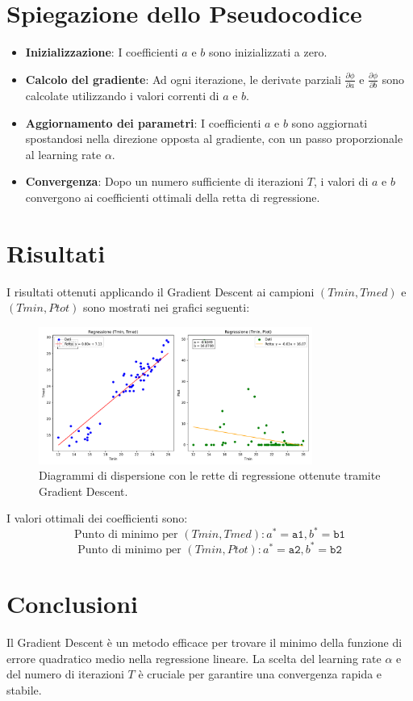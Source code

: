 \documentclass{article}
\begin{document}
\section{Spiegazione dello Pseudocodice}
\begin{itemize}
    \item \textbf{Inizializzazione}: I coefficienti \(a\) e \(b\) sono inizializzati a zero.
    \item \textbf{Calcolo del gradiente}: Ad ogni iterazione, le derivate parziali \(\frac{\partial \phi}{\partial a}\) e \(\frac{\partial \phi}{\partial b}\) sono calcolate utilizzando i valori correnti di \(a\) e \(b\).
    \item \textbf{Aggiornamento dei parametri}: I coefficienti \(a\) e \(b\) sono aggiornati spostandosi nella direzione opposta al gradiente, con un passo proporzionale al learning rate \(\alpha\).
    \item \textbf{Convergenza}: Dopo un numero sufficiente di iterazioni \(T\), i valori di \(a\) e \(b\) convergono ai coefficienti ottimali della retta di regressione.
\end{itemize}

\section{Risultati}
I risultati ottenuti applicando il Gradient Descent ai campioni \((Tmin, Tmed)\) e \((Tmin, Ptot)\) sono mostrati nei grafici seguenti:

\begin{figure}[H]
    \centering
    \includegraphics[width=0.8\textwidth]{gradient_descent_regression_plots.pdf}
    \caption{Diagrammi di dispersione con le rette di regressione ottenute tramite Gradient Descent.}
\end{figure}

I valori ottimali dei coefficienti sono:
\[
\text{Punto di minimo per } (Tmin, Tmed): a^* = \texttt{a1}, b^* = \texttt{b1}
\]
\[
\text{Punto di minimo per } (Tmin, Ptot): a^* = \texttt{a2}, b^* = \texttt{b2}
\]

\section{Conclusioni}
Il Gradient Descent è un metodo efficace per trovare il minimo della funzione di errore quadratico medio nella regressione lineare. La scelta del learning rate \(\alpha\) e del numero di iterazioni \(T\) è cruciale per garantire una convergenza rapida e stabile.
\end{document}
